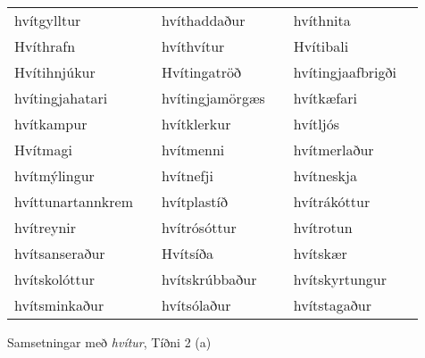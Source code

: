 \documentclass{../litmal.tex}{subfiles}
\begin{document}
\begin{wordlist}[H]
\begin{tcolorbox}
\begin{tabular}{BlBlBl}
		hvítgylltur			&		& 
		hvíthaddaður		&		& 
		hvíthnita			&		\\  %
		Hvíthrafn			&		& 	
		hvíthvítur			&		& 	
		Hvítibali			&		\\ 	%
		Hvítihnjúkur		&		& 
		Hvítingatröð		&		& 
		hvítingjaafbrigði	&		\\ 	%
		hvítingjahatari		&		& 
		hvítingjamörgæs	&		& 	
		hvítkæfari			&		\\  %
		hvítkampur		&		& 		
		hvítklerkur		&		& 	
		hvítljós			&		\\ 	%
		Hvítmagi			&		& 	
		hvítmenni			&		& 	
		hvítmerlaður		&		\\ 	%
		hvítmýlingur		&		& 
		hvítnefji			&		& 
		hvítneskja		&		\\  %
		hvíttunartannkrem	&		& 	
		hvítplastíð			& 		& 
		hvítrákóttur		& 		\\ 	%
		hvítreynir			&		& 	
		hvítrósóttur		&		& 	
		hvítrotun			&		\\ 	%
		hvítsanseraður		&		& 	
		Hvítsíða			&		& 
		hvítskær			&		\\  %
		hvítskolóttur		&		& 
		hvítskrúbbaður		&		& 
		hvítskyrtungur		&		\\ 	%
		hvítsminkaður		&		& 	
		hvítsólaður		&		& 	
		hvítstagaður		&		 	%
	\end{tabular}

\end{tcolorbox}
	\caption{Samsetningar með \textit{hvítur}, Tíðni 2 (a)}
	\label{listi:hvitt:2a}
\end{wordlist}	
		
\end{document}
